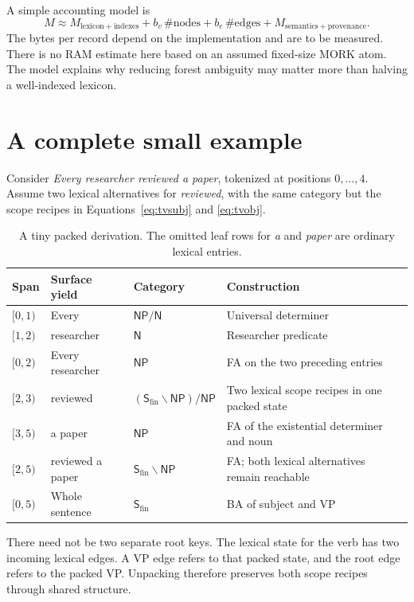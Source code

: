 \documentclass[11pt,a4paper]{article}
\newcommand{\NP}{\mathsf{NP}}
\newcommand{\NC}{\mathsf{N}}
\newcommand{\SF}{\mathsf{S}_{\mathrm{fin}}}
\begin{document}
A simple accounting model is
\[
 M \approx M_{\mathrm{lexicon+indexes}}
    +b_v\,\#\mathrm{nodes}
    +b_e\,\#\mathrm{edges}
    +M_{\mathrm{semantics+provenance}}.
\]
The bytes per record depend on the implementation and are to be measured.
There is no RAM estimate here based on an assumed fixed-size MORK atom.
The model explains why reducing forest ambiguity may matter more than
halving a well-indexed lexicon.

\section{A complete small example}\label{sec:example}

Consider \emph{Every researcher reviewed a paper}, tokenized at positions
\(0,\ldots,4\). Assume two lexical alternatives for \emph{reviewed},
with the same category but the scope recipes in
Equations~\eqref{eq:tvsubj} and \eqref{eq:tvobj}.

\begin{table}[htbp]
\small
\begin{tabularx}{\textwidth}{L{15mm}L{38mm}L{40mm}Y}
\toprule
Span & Surface yield & Category & Construction \\
\midrule
\([0,1)\) & Every & \(\NP/\NC\) & Universal determiner \\
\([1,2)\) & researcher & \(\NC\) & Researcher predicate \\
\([0,2)\) & Every researcher & \(\NP\) & FA on the two preceding entries \\
\([2,3)\) & reviewed & \((\SF\backslash\NP)/\NP\) &
Two lexical scope recipes in one packed state \\
\([3,5)\) & a paper & \(\NP\) &
FA of the existential determiner and noun \\
\([2,5)\) & reviewed a paper & \(\SF\backslash\NP\) &
FA; both lexical alternatives remain reachable \\
\([0,5)\) & Whole sentence & \(\SF\) &
BA of subject and VP \\
\bottomrule
\end{tabularx}
\caption{A tiny packed derivation. The omitted leaf rows for \emph{a}
and \emph{paper} are ordinary lexical entries.}
\end{table}

There need not be two separate root keys. The lexical state for the verb
has two incoming lexical edges. A VP edge refers to that packed state, and
the root edge refers to the packed VP. Unpacking therefore preserves both
scope recipes through shared structure.
\end{document}
